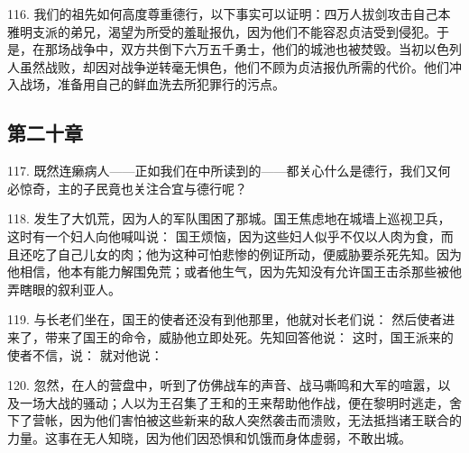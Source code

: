 116. 我们的祖先如何高度尊重德行，以下事实可以证明：四万人拔剑攻击自己本雅明支派的弟兄，渴望为所受的羞耻报仇，因为他们不能容忍贞洁受到侵犯。于是，在那场战争中，双方共倒下六万五千勇士，他们的城池也被焚毁。当初以色列人虽然战败，却因对战争逆转毫无惧色，他们不顾为贞洁报仇所需的代价。他们冲入战场，准备用自己的鲜血洗去所犯罪行的污点。\par


\subsection{第二十章}

\par

117. 既然连癞病人——正如我们在中所读到的——都关心什么是德行，我们又何必惊奇，主的子民竟也关注合宜与德行呢？\par

118. 发生了大饥荒，因为人的军队围困了那城。国王焦虑地在城墙上巡视卫兵，这时有一个妇人向他喊叫说： 国王烦恼，因为这些妇人似乎不仅以人肉为食，而且还吃了自己儿女的肉；他为这种可怕悲惨的例证所动，便威胁要杀死先知。因为他相信，他本有能力解围免荒；或者他生气，因为先知没有允许国王击杀那些被他弄瞎眼的叙利亚人。\par

119. 与长老们坐在，国王的使者还没有到他那里，他就对长老们说： 然后使者进来了，带来了国王的命令，威胁他立即处死。先知回答他说： 这时，国王派来的使者不信，说： 就对他说：\par

120. 忽然，在人的营盘中，听到了仿佛战车的声音、战马嘶鸣和大军的喧嚣，以及一场大战的骚动；人以为王召集了王和的王来帮助他作战，便在黎明时逃走，舍下了营帐，因为他们害怕被这些新来的敌人突然袭击而溃败，无法抵挡诸王联合的力量。这事在无人知晓，因为他们因恐惧和饥饿而身体虚弱，不敢出城。\par

